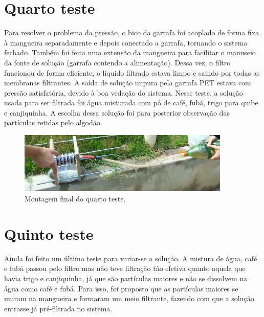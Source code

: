 \section{Quarto teste}\label{sec:quarto_teste}

Para resolver o problema da pressão, o bico da garrafa foi acoplado de forma
fixa à mangueira separadamente e depois conectado a garrafa, tornando o sistema
fechado. Também foi feita uma extensão da mangueira para facilitar o manuseio da
fonte de solução (garrafa contendo a alimentação). Dessa vez, o filtro funcionou
de forma eficiente, o líquido filtrado estava limpo e saindo por todas as
membranas filtrantes. A saída de solução impura pela garrafa PET estava com
pressão satisfatória, devido à boa vedação do sistema. Nesse teste, a solução
usada para ser filtrada foi água misturada com pó de café, fubá, trigo para
quibe e canjiquinha. A escolha dessa solução foi para posterior observação das
partículas retidas pelo algodão.

\begin{figure}[H]
  \centering
  \includegraphics[width=0.9\textwidth]{figuras/quarto_teste.png}
  \caption{Montagem final do quarto teste.\label{fig:quarto_teste}}
\end{figure}


\section{Quinto teste}\label{sec:quinto_teste}

Ainda foi feito um último teste para variar-se a solução. A mistura de água,
café e fubá passou pelo filtro mas não teve filtração tão efetiva quanto aquela
que havia trigo e canjiquinha, já que são partículas maiores e não se dissolvem
na água como café e fubá. Para isso, foi proposto que as partículas maiores se
uniram na mangueira e formaram um meio filtrante, fazendo com que a solução
entrasse já pré-filtrada no sistema.



